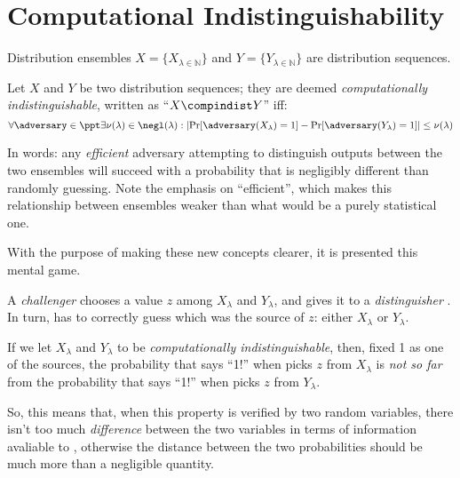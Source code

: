 \section{Computational Indistinguishability}

Distribution ensembles $X = \{X_{\lambda \in \mathbb{N}}\}$ and $Y = \{Y_{\lambda \in \mathbb{N}}\}$ are distribution sequences.

\begin{definition}
    Let $X$ and $Y$ be two distribution sequences; they are deemed \emph{computationally indistinguishable}, written as ``$X \compindist Y$'' iff:
    \[
        \forall \adversary \in \ppt \exists \nu(\lambda) \in \negl(\lambda) : \left|\Pr[\adversary(X_\lambda) = 1] - \Pr[\adversary(Y_\lambda) = 1]\right| \leq \nu(\lambda) 
    \]
\end{definition}

In words: any \emph{efficient} adversary attempting to distinguish outputs between the two ensembles will succeed with a probability that is negligibly different than randomly guessing. Note the emphasis on ``efficient'', which makes this relationship between ensembles weaker than what would be a purely statistical one.

With the purpose of making these new concepts clearer, it is presented this mental game.


A \emph{challenger} \challenger{} chooses a value $z$ among $X_\lambda$ and $Y_\lambda$, and gives it to a \emph{distinguisher} \distinguisher{}. In turn, \distinguisher{} has to correctly guess which was the source of $z$: either $X_\lambda$ or $Y_\lambda$. 

If we let $X_\lambda$ and $Y_\lambda$ to be \emph{computationally indistinguishable}, then, fixed 1 as one of the sources, the probability that \distinguisher{} says ``1!'' when \challenger{} picks $z$ from $X_\lambda$ is \emph{not so far} from the probability that \distinguisher{} says ``1!'' when \challenger{} picks $z$ from $Y_\lambda$.

So, this means that, when this property is verified by two random variables, there isn't too much \textit{difference} between the two variables in terms of information avaliable to \distinguisher{}, otherwise the distance between the two probabilities should be much more than a negligible quantity.

